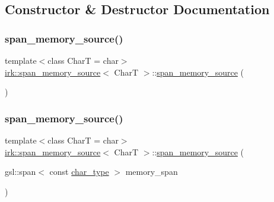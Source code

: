\subsection{Constructor \& Destructor Documentation}
\mbox{\label{classirk_1_1span__memory__source_a39cae60a3e106cb9cb977b46e540c8b3}} 
\subsubsection{\texorpdfstring{span\+\_\+memory\+\_\+source()}{span\_memory\_source()}\hspace{0.1cm}{\footnotesize\ttfamily [1/2]}}
{\footnotesize\ttfamily template$<$class CharT  = char$>$ \\
\mbox{\hyperlink{classirk_1_1span__memory__source}{irk\+::span\+\_\+memory\+\_\+source}}$<$ CharT $>$\+::\mbox{\hyperlink{classirk_1_1span__memory__source}{span\+\_\+memory\+\_\+source}} (\begin{DoxyParamCaption}{ }\end{DoxyParamCaption})\hspace{0.3cm}{\ttfamily [default]}}

\mbox{\label{classirk_1_1span__memory__source_a4de152530448b9a46951d99320333ca9}} 
\subsubsection{\texorpdfstring{span\+\_\+memory\+\_\+source()}{span\_memory\_source()}\hspace{0.1cm}{\footnotesize\ttfamily [2/2]}}
{\footnotesize\ttfamily template$<$class CharT  = char$>$ \\
\mbox{\hyperlink{classirk_1_1span__memory__source}{irk\+::span\+\_\+memory\+\_\+source}}$<$ CharT $>$\+::\mbox{\hyperlink{classirk_1_1span__memory__source}{span\+\_\+memory\+\_\+source}} (\begin{DoxyParamCaption}\item[{gsl\+::span$<$ const \mbox{\hyperlink{classirk_1_1span__memory__source_a769d88b11f7c2882a006e93edb2cdb79}{char\+\_\+type}} $>$}]{memory\+\_\+span }\end{DoxyParamCaption})\hspace{0.3cm}{\ttfamily [inline]}}



